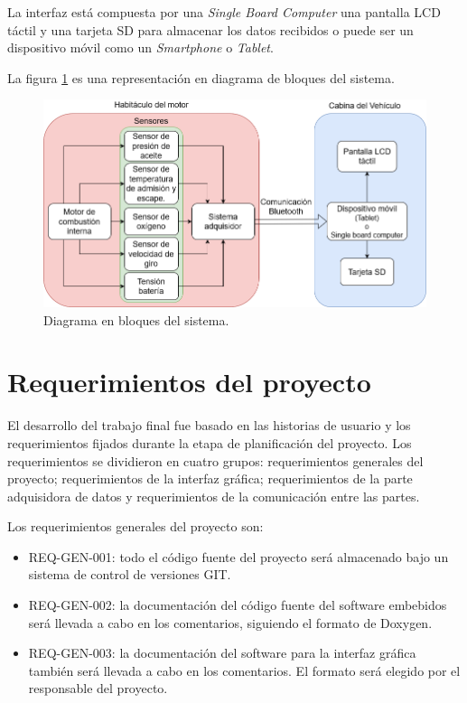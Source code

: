 La interfaz está compuesta por una \textit{Single Board Computer} una pantalla LCD táctil y una tarjeta SD para almacenar los datos recibidos o puede ser un dispositivo móvil como un \textit{Smartphone} o \textit{Tablet}.

La figura \ref{fig:diagrama-de-bloques} es una representación en diagrama de bloques del sistema.

\begin{figure}[htpb]
\centering
\includegraphics[width=.9\textwidth]{./Figures/diagrama-proyecto.png}
\caption{Diagrama en bloques del sistema.}
\label{fig:diagrama-de-bloques}
\end{figure}

\section{Requerimientos del proyecto}

El desarrollo del trabajo final fue basado en las historias de usuario y los requerimientos fijados durante la etapa de planificación del proyecto. Los requerimientos se dividieron en cuatro grupos: requerimientos generales del proyecto; requerimientos de la interfaz gráfica; requerimientos de la parte adquisidora de datos y requerimientos de la comunicación entre las partes.

Los requerimientos generales del proyecto son:
\begin{itemize}
\item REQ-GEN-001: todo el código fuente del proyecto será almacenado bajo un sistema de control de versiones GIT.
\item REQ-GEN-002: la documentación del código fuente del software embebidos será llevada a cabo en los comentarios, siguiendo el formato de Doxygen.
\item REQ-GEN-003: la documentación del software para la interfaz gráfica también será llevada a cabo en los comentarios. El formato será elegido por el responsable del proyecto.
\end{itemize}

